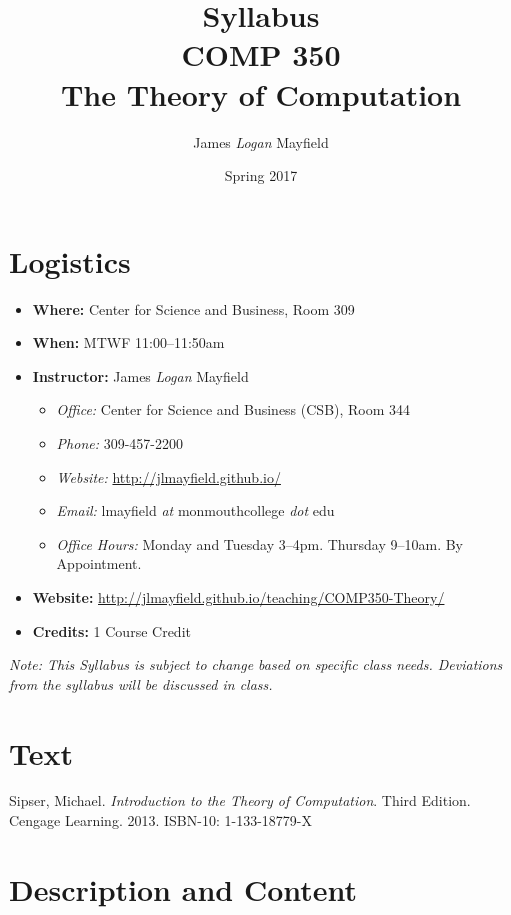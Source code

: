 \documentclass[10pt]{article}
\title{Syllabus \\ COMP 350 \\ The Theory of Computation}
\author{ James \textit{Logan} Mayfield }
\date{ Spring 2017 }
\begin{document}
\maketitle

\section{Logistics}
\begin{itemize}
\item \textbf{Where: } Center for Science and Business, Room 309
\item \textbf{When: } MTWF 11:00--11:50am
\item \textbf{Instructor: } James \textit{Logan} Mayfield\begin{itemize}
\item \textit{Office: } Center for Science and Business (CSB), Room 344
\item \textit{Phone: } 309-457-2200 %
\item \textit{Website: } \url{http://jlmayfield.github.io/}
\item \textit{Email: } lmayfield \textit{at} monmouthcollege \textit{dot} edu
\item \textit{Office Hours: }  Monday and Tuesday 3--4pm. Thursday 9--10am. By Appointment.
\end{itemize}
\item \textbf{Website: } \url{http://jlmayfield.github.io/teaching/COMP350-Theory/}
\item \textbf{Credits: } 1 Course Credit
\end{itemize}
\emph{Note: This Syllabus is subject to change based on specific class needs. Deviations from the syllabus will be discussed in class.}


\section{Text}

Sipser, Michael. \textit{Introduction to the Theory of Computation}. Third Edition. Cengage Learning. 2013. ISBN-10: 1-133-18779-X %


\section{Description and Content}
\end{document}
